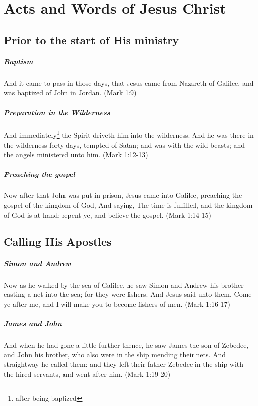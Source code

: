 \chapter{Acts and Words of Jesus Christ}

\section{Prior to the start of His ministry}

\paragraph{Baptism}
And it came to pass in those days, that Jesus came from Nazareth of Galilee, and was baptized of John in Jordan. (Mark 1:9)

\paragraph{Preparation in the Wilderness}
And immediately\footnote{after being baptized} the Spirit driveth him into the wilderness. And he was there in the wilderness forty days, tempted of Satan; and was with the wild beasts; and the angels ministered unto him. (Mark 1:12-13)

\paragraph{Preaching the gospel}
Now after that John was put in prison, Jesus came into Galilee, preaching the gospel of the kingdom of God, And saying, The time is fulfilled, and the kingdom of God is at hand: repent ye, and believe the gospel. (Mark 1:14-15)

\section{Calling His Apostles}

\paragraph{Simon and Andrew}
Now as he walked by the sea of Galilee, he saw Simon and Andrew his brother casting a net into the sea; for they were fishers. And Jesus said unto them, Come ye after me, and I will make you to become fishers of men. (Mark 1:16-17)

\paragraph{James and John}
And when he had gone a little further thence, he saw James the son of Zebedee, and John his brother, who also were in the ship mending their nets. And straightway he called them: and they left their father Zebedee in the ship with the hired servants, and went after him. (Mark 1:19-20)

